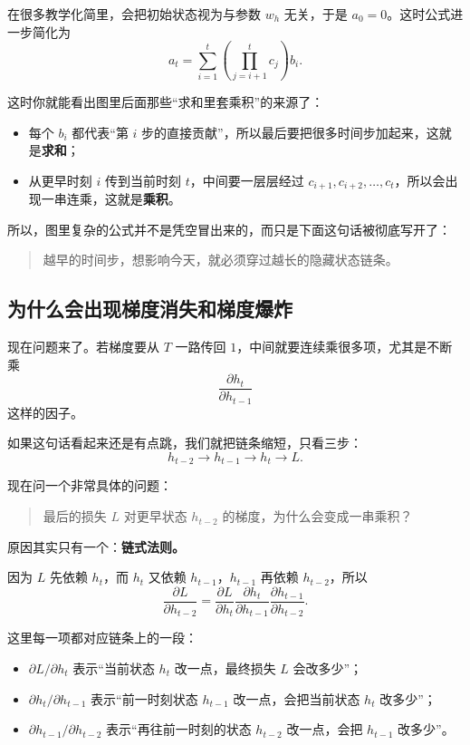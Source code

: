 \documentclass[12pt,a4paper]{ctexart}
\begin{document}
在很多教学化简里，会把初始状态视为与参数 \(w_h\) 无关，于是 \(a_0 = 0\)。这时公式进一步简化为
\[
a_t
=
\sum_{i=1}^{t}
\left(
\prod_{j=i+1}^{t} c_j
\right)b_i.
\]

这时你就能看出图里后面那些“求和里套乘积”的来源了：
\begin{itemize}
  \item 每个 \(b_i\) 都代表“第 \(i\) 步的直接贡献”，所以最后要把很多时间步加起来，这就是\textbf{求和}；
  \item 从更早时刻 \(i\) 传到当前时刻 \(t\)，中间要一层层经过 \(c_{i+1}, c_{i+2}, \ldots, c_t\)，所以会出现一串连乘，这就是\textbf{乘积}。
\end{itemize}

所以，图里复杂的公式并不是凭空冒出来的，而只是下面这句话被彻底写开了：
\begin{quote}
越早的时间步，想影响今天，就必须穿过越长的隐藏状态链条。
\end{quote}

\subsection{为什么会出现梯度消失和梯度爆炸}

现在问题来了。若梯度要从 \(T\) 一路传回 \(1\)，中间就要连续乘很多项，尤其是不断乘
\[
\frac{\partial h_t}{\partial h_{t-1}}
\]
这样的因子。

如果这句话看起来还是有点跳，我们就把链条缩短，只看三步：
\[
h_{t-2} \longrightarrow h_{t-1} \longrightarrow h_t \longrightarrow L.
\]

现在问一个非常具体的问题：
\begin{quote}
最后的损失 \(L\) 对更早状态 \(h_{t-2}\) 的梯度，为什么会变成一串乘积？
\end{quote}

原因其实只有一个：\textbf{链式法则。}

因为 \(L\) 先依赖 \(h_t\)，而 \(h_t\) 又依赖 \(h_{t-1}\)，\(h_{t-1}\) 再依赖 \(h_{t-2}\)，所以
\[
\frac{\partial L}{\partial h_{t-2}}
=
\frac{\partial L}{\partial h_t}
\frac{\partial h_t}{\partial h_{t-1}}
\frac{\partial h_{t-1}}{\partial h_{t-2}}.
\]

这里每一项都对应链条上的一段：
\begin{itemize}
  \item \(\partial L/\partial h_t\) 表示“当前状态 \(h_t\) 改一点，最终损失 \(L\) 会改多少”；
  \item \(\partial h_t/\partial h_{t-1}\) 表示“前一时刻状态 \(h_{t-1}\) 改一点，会把当前状态 \(h_t\) 改多少”；
  \item \(\partial h_{t-1}/\partial h_{t-2}\) 表示“再往前一时刻的状态 \(h_{t-2}\) 改一点，会把 \(h_{t-1}\) 改多少”。
\end{itemize}
\end{document}
